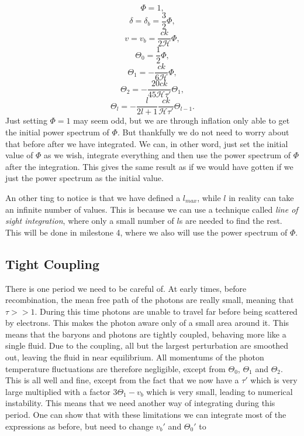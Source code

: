 \documentclass[a4paper,norsk, 10pt]{article}
\begin{document}
\begin{equation}
\Phi = 1,
\end{equation}
\begin{equation}
\delta = \delta_b = \frac{3}{2}\Phi,
\end{equation}
\begin{equation}
v = v_b = \frac{ck}{2\mathcal{H}}\Phi,
\end{equation}
\begin{equation}
\Theta_0 = \frac{1}{2}\Phi,
\end{equation}
\begin{equation}
\Theta_1 = -\frac{ck}{6\mathcal{H}}\Phi,
\end{equation}
\begin{equation}
\Theta_2 = -\frac{20ck}{45\mathcal{H}\tau'}\Theta_1,
\end{equation}
\begin{equation}
\Theta_l = -\frac{l}{2l+1}\frac{ck}{\mathcal{H}\tau'}\Theta_{l-1}.
\end{equation}
Just setting $\Phi = 1$ may seem odd, but we are through inflation only able to get the initial power spectrum of $\Phi$. But thankfully we do not need to worry about that before after we have integrated. We can, in other word, just set the initial value of $\Phi$ as we wish, integrate everything and then use the power spectrum of $\Phi$ after the integration. This gives the same result as if we would have gotten if we just the power spectrum as the initial value.

An other ting to notice is that we have defined a $l_{max}$, while $l$ in reality can take an infinite number of values. This is because we can use a technique called \textit{line of sight integration}, where only a small number of $l$s are needed to find the rest. This will be done in milestone 4, where we also will use the power spectrum of $\Phi$.


\subsection{Tight Coupling}\label{sec:tight}
There is one period we need to be careful of. At early times, before recombination, the mean free path of the photons are really small, meaning that $\tau >> 1$. During this time photons are unable to travel far before being scattered by electrons. This makes the photon aware only of a small area around it. This means that the baryons and photons are tightly coupled, behaving more like a single fluid. Due to the coupling, all but the largest perturbation are smoothed out, leaving the fluid in near equilibrium. All momentums of the photon temperature fluctuations are therefore negligible, except from $\Theta_0$, $\Theta_1$ and $\Theta_2$. This is all well and fine, except from the fact that we now have a $\tau'$ which is very large multiplied with a factor $3\Theta_1-v_b$ which is very small, leading to numerical instability. This means that we need another way of integrating during this period. One can show that with these limitations we can integrate most of the expressions as before, but need to change $v_b'$ and $\Theta_0'$ to
\end{document}
